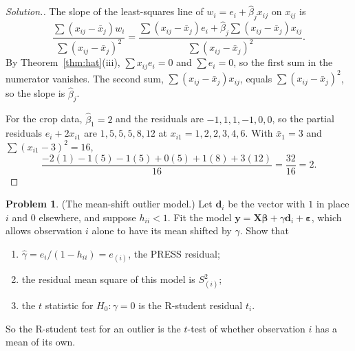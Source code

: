 \documentclass[11pt,a4paper]{article}
\numberwithin{equation}{section}
\theoremstyle{definition}
\newtheorem{problemx}{Problem}[subsection]
\newenvironment{problem}{\begin{problemx}}{\end{problemx}}
\newenvironment{solution}
  {\renewcommand{\qedsymbol}{}\begin{proof}[\textit{Solution}.]}
  {\end{proof}}
\begin{document}
\begin{solution}
The slope of the least-squares line of $w_i = e_i + \hat\beta_j x_{ij}$ on $x_{ij}$ is
\[
\frac{\sum (x_{ij} - \bar x_j) w_i}{\sum (x_{ij} - \bar x_j)^2}
= \frac{\sum (x_{ij} - \bar x_j) e_i + \hat\beta_j \sum (x_{ij} - \bar x_j) x_{ij}}{\sum (x_{ij} - \bar x_j)^2} .
\]
By Theorem~\ref{thm:hat}(iii), $\sum x_{ij}e_i = 0$ and $\sum e_i = 0$, so the first sum in the
numerator vanishes. The second sum, $\sum(x_{ij} - \bar x_j)x_{ij}$, equals
$\sum(x_{ij} - \bar x_j)^2$, so the slope is $\hat\beta_j$.

For the crop data, $\hat\beta_1 = 2$ and the residuals are $-1, 1, 1, -1, 0, 0$, so the
partial residuals $e_i + 2x_{i1}$ are $1, 5, 5, 5, 8, 12$ at $x_{i1} = 1, 2, 2, 3, 4, 6$. With
$\bar x_1 = 3$ and $\sum(x_{i1} - 3)^2 = 16$,
\[
\frac{-2(1) - 1(5) - 1(5) + 0(5) + 1(8) + 3(12)}{16} = \frac{32}{16} = 2 .
\]
\end{solution}

\begin{problem}\label{prob:mean-shift}
(The mean-shift outlier model.) Let $\mathbf{d}_i$ be the vector with $1$ in place $i$ and
$0$ elsewhere, and suppose $h_{ii} < 1$. Fit the model
$\mathbf{y} = \mathbf{X}\boldsymbol\beta + \gamma\mathbf{d}_i + \boldsymbol\varepsilon$,
which allows observation $i$ alone to have its mean shifted by $\gamma$. Show that
\begin{enumerate}[label=(\alph*)]
\item $\hat\gamma = e_i/(1 - h_{ii}) = e_{(i)}$, the PRESS residual;
\item the residual mean square of this model is $S^2_{(i)}$;
\item the $t$ statistic for $H_0\colon \gamma = 0$ is the R-student residual $t_i$.
\end{enumerate}
So the R-student test for an outlier is the $t$-test of whether observation $i$ has a
mean of its own.
\end{problem}
\end{document}
